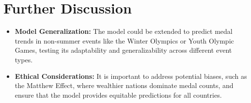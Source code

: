 \documentclass{mcmthesis}
\begin{document}
\section{Further Discussion}

\begin{itemize}[itemsep=1pt, parsep=2pt, topsep=0pt]
	\item \textbf{Model Generalization:} The model could be extended to predict medal trends in non-summer events like the Winter Olympics or Youth Olympic Games, testing its adaptability and generalizability across different event types.
	\item \textbf{Ethical Considerations:} It is important to address potential biases, such as the Matthew Effect, where wealthier nations dominate medal counts, and ensure that the model provides equitable predictions for all countries.
\end{itemize}

	
	
	
%	
		
%		
%		
%		
%		
	
	
	
	
	
	
	
	
	
	
	\printbibliography
	
	
	
	
	
\end{document}
